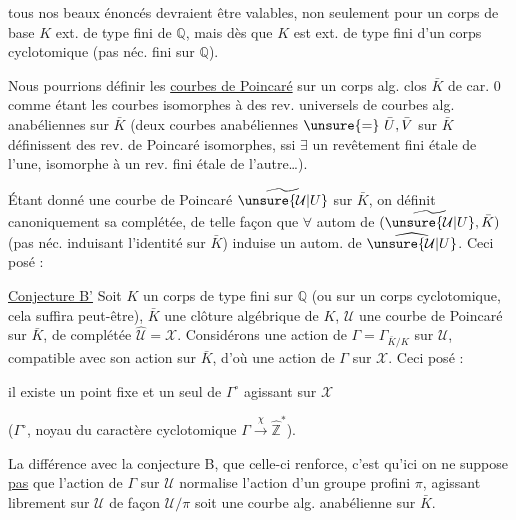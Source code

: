 tous nos beaux énoncés devraient être valables, non seulement pour un corps de base $K$ ext. de type fini de $\mathbb{Q}$, mais dès que $K$ est ext. de type fini d'un corps cyclotomique (pas néc. fini sur $\mathbb{Q}$).

Nous pourrions définir les \uline{courbes de Poincaré} sur un corps alg. clos $\bar K$ de car. $0$ comme étant les courbes isomorphes à des rev. universels de courbes alg. anabéliennes sur $\bar K$ (deux courbes anabéliennes $\unsure{=}\ \bar U,\bar V$ sur $\bar K$ définissent des rev. de Poincaré isomorphes, ssi $\exists$ un revêtement fini étale de l'une, isomorphe à un rev. fini étale de l'autre\ldots).

Étant donné une courbe de Poincaré $\widetilde{\unsure{\mathcal U|U}}$ sur $\bar K$,  on définit canoniquement sa complétée, de telle façon que $\forall$ autom de $(\widetilde{\unsure{\mathcal U|U}},\bar K)$ (pas néc. induisant l'identité sur $\bar K$) induise un autom. de $\widehat{\unsure{\mathcal U|U}}$.
Ceci posé :

\uline{Conjecture B'} Soit $K$ un corps de type fini sur $\mathbb{Q}$ (ou sur un corps cyclotomique, cela suffira peut-être), $\bar K$ une clôture algébrique de $K$, $\mathcal U$ une courbe de Poincaré sur $\bar K$, de complétée $\widehat{\mathcal U}=\mathcal X$. Considérons une action de $\Gamma=\Gamma_{\bar K/K}$ sur $\mathcal U$, compatible avec son action sur $\bar K$, d'où une action de $\Gamma$ sur $\mathcal X$. Ceci posé :

il existe un point fixe et un seul de $\Gamma^\circ$ agissant sur $\mathcal X$

($\Gamma^\circ$, noyau du caractère cyclotomique $\Gamma\xrightarrow{\chi}\widehat{\mathbb Z}^{\!*}$).

La différence avec la conjecture B, que celle-ci renforce, c'est qu'ici on ne suppose \uline{pas} que l'action de $\Gamma$ sur $\mathcal U$ normalise l'action d'un groupe profini $\pi$, agissant librement sur $\mathcal U$ de façon  $\mathcal U/\pi$ soit une courbe alg. anabélienne sur $\bar K$.

